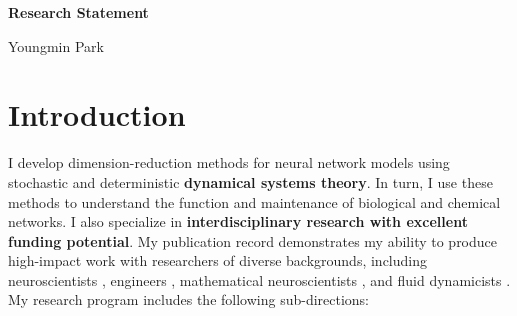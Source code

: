 \documentclass[a4paper,11pt]{article}
\begin{document}
	
	\begin{center}
		\Large \textbf{Research Statement}
		
		\Large Youngmin Park
	\end{center}
	
	\section{Introduction}
	
	I develop dimension-reduction methods for neural network models using stochastic and deterministic \textbf{dynamical systems theory}. In turn, I use these methods to understand the function and maintenance of biological and chemical networks. I also specialize in \textbf{interdisciplinary research with excellent funding potential}. My publication record demonstrates my ability to produce high-impact work with researchers of diverse backgrounds, including neuroscientists \cite{park2020circuit}, engineers \cite{ermentrout2019recent,park2020high}, mathematical neuroscientists \cite{park2016weakly,park2018infinitesimal,park2018multiple,park2018scalar}, and fluid dynamicists \cite{park2020dynamics}. My research program includes the following sub-directions:
	
\end{document}
